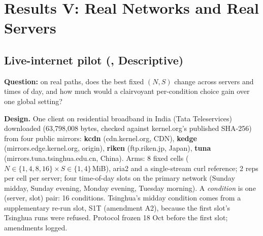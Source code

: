 \chapter{Results V: Real Networks and Real Servers}\label{ch:real}

\section{Live-internet pilot (, Descriptive)}
\textbf{Question:} on real paths, does the best fixed $(N,S)$ change across servers and times of day, and how much would a clairvoyant per-condition choice gain over one global setting?

\textbf{Design.} One client on residential broadband in India (Tata Teleservices) downloaded  (63{,}798{,}008 bytes, checked against kernel.org's published SHA-256) from four public mirrors: \textbf{kcdn} (cdn.kernel.org, CDN), \textbf{kedge} (mirrors.edge.kernel.org, origin), \textbf{riken} (ftp.riken.jp, Japan), \textbf{tuna} (mirrors.tuna.tsinghua.edu.cn, China). Arms: 8 fixed cells ($N\in\{1,4,8,16\}\times S\in\{1,4\}$\,MiB), aria2 and a single-stream curl reference; 2 reps per cell per server; four time-of-day slots on the primary network (Sunday midday, Sunday evening, Monday evening, Tuesday morning). A \emph{condition} is one (server, slot) pair: 16 conditions. Tsinghua's midday condition comes from a supplementary re-run slot, S1T (amendment A2), because the first slot's Tsinghua runs were refused. Protocol frozen 18 Oct before the first slot; amendments logged.

